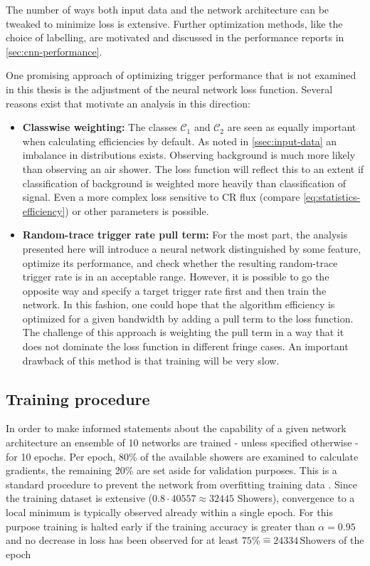 The number of ways both input data and the network architecture can be tweaked to minimize loss is extensive. Further optimization methods, like the choice of 
labelling, are motivated and discussed in the performance reports in \autoref{sec:cnn-performance}.

One promising approach of optimizing trigger performance that is not examined in this thesis is the adjustment of the neural network loss function. Several reasons
exist that motivate an analysis in this direction:

\begin{itemize}
	\item \textbf{Classwise weighting:} The classes $\mathcal{C}_1$ and $\mathcal{C}_2$ are seen as equally important when calculating efficiencies by default. 
	As noted in \autoref{ssec:input-data} an imbalance in distributions exists. Observing background is much more likely than observing an air shower. The loss 
	function will reflect this to an extent if classification of background is weighted more heavily than classification of signal. Even a more complex loss 
	sensitive to CR flux (compare \autoref{eq:statistics-efficiency}) or other parameters is possible.
	\item \textbf{Random-trace trigger rate pull term:} For the most part, the analysis presented here will introduce a neural network distinguished by some 
	feature, optimize its performance, and check whether the resulting random-trace trigger rate is in an acceptable range. However, it is possible to go the 
	opposite way and specify a target trigger rate first and then train the network. In this fashion, one could hope that the algorithm efficiency is optimized for
	a given bandwidth by adding a pull term to the loss function. The challenge of this approach is weighting the pull term in a way that it does not dominate the 
	loss function in different fringe cases. An important drawback of this method is that training will be very slow.
\end{itemize}

\subsection{Training procedure}
\label{ssec:training-procedure}

In order to make informed statements about the capability of a given network architecture an ensemble of 10 networks are trained - unless specified otherwise - for 
10 epochs. Per epoch, 80\% of the available showers are examined to calculate gradients, the remaining 20\% are set aside for validation purposes. This is a standard 
procedure to prevent the network from overfitting training data \cite{nasteski2017overview}. Since the training dataset is extensive ($0.8\cdot40557\approx32445$ 
Showers), convergence to a local minimum is typically observed already within a single epoch. For this purpose training is halted early if the training accuracy
is greater than $\alpha = 0.95$ and no decrease in loss has been observed for at least $75\% \hat{=} 24334\,\text{Showers}$ of the epoch

